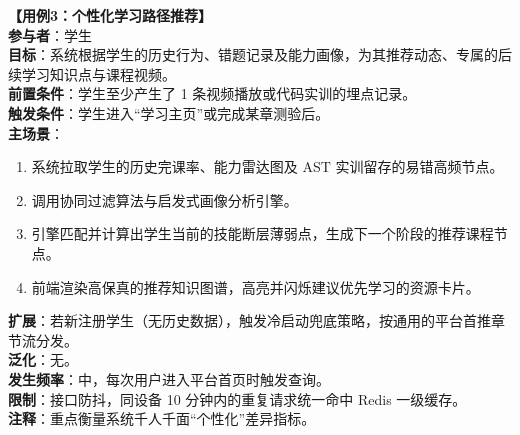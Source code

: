 \vspace{1em}
\noindent\textbf{【用例3：个性化学习路径推荐】}\\
\textbf{参与者}：学生\\
\textbf{目标}：系统根据学生的历史行为、错题记录及能力画像，为其推荐动态、专属的后续学习知识点与课程视频。\\
\textbf{前置条件}：学生至少产生了 1 条视频播放或代码实训的埋点记录。\\
\textbf{触发条件}：学生进入“学习主页”或完成某章测验后。\\
\textbf{主场景}：
\begin{enumerate}
    \item 系统拉取学生的历史完课率、能力雷达图及 AST 实训留存的易错高频节点。
    \item 调用协同过滤算法与启发式画像分析引擎。
    \item 引擎匹配并计算出学生当前的技能断层薄弱点，生成下一个阶段的推荐课程节点。
    \item 前端渲染高保真的推荐知识图谱，高亮并闪烁建议优先学习的资源卡片。
\end{enumerate}
\textbf{扩展}：若新注册学生（无历史数据），触发冷启动兜底策略，按通用的平台首推章节流分发。\\
\textbf{泛化}：无。\\
\textbf{发生频率}：中，每次用户进入平台首页时触发查询。\\
\textbf{限制}：接口防抖，同设备 10 分钟内的重复请求统一命中 Redis 一级缓存。\\
\textbf{注释}：重点衡量系统千人千面“个性化”差异指标。

